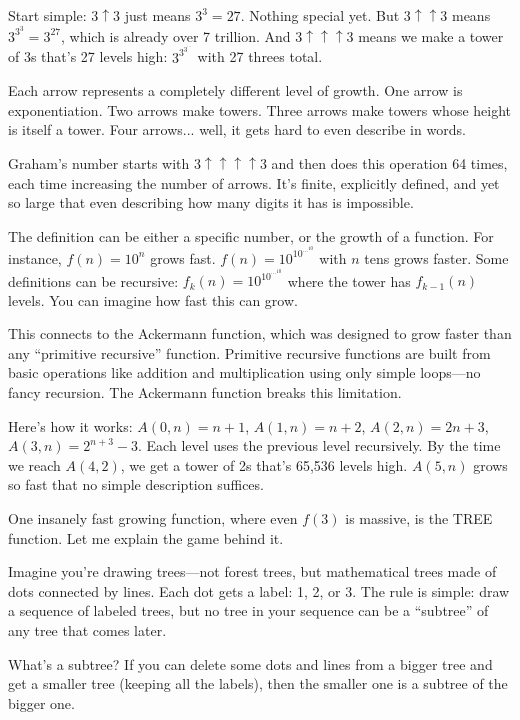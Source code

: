 Start simple: $3 \uparrow 3$ just means $3^3 = 27$. Nothing special yet. But $3 \uparrow\uparrow 3$ means $3^{3^3} = 3^{27}$, which is already over 7 trillion. And $3 \uparrow\uparrow\uparrow 3$ means we make a tower of 3s that's 27 levels high: $3^{3^{3^{\cdots}}}$ with 27 threes total.

Each arrow represents a completely different level of growth. One arrow is exponentiation. Two arrows make towers. Three arrows make towers whose height is itself a tower. Four arrows... well, it gets hard to even describe in words.

Graham's number starts with $3 \uparrow\uparrow\uparrow\uparrow 3$ and then does this operation 64 times, each time increasing the number of arrows. It's finite, explicitly defined, and yet so large that even describing how many digits it has is impossible.

The definition can be either a specific number, or the growth of a function. For instance, $f(n) = 10^n$ grows fast. $f(n) = 10^{10^{\cdots^{10}}}$ with $n$ tens grows faster. Some definitions can be recursive: $f_k(n) = 10^{10^{\cdots^{10}}}$ where the tower has $f_{k-1}(n)$ levels. You can imagine how fast this can grow.

This connects to the Ackermann function, which was designed to grow faster than any ``primitive recursive'' function. Primitive recursive functions are built from basic operations like addition and multiplication using only simple loops—no fancy recursion. The Ackermann function breaks this limitation.

Here's how it works: $A(0,n) = n+1$, $A(1,n) = n+2$, $A(2,n) = 2n+3$, $A(3,n) = 2^{n+3} - 3$. Each level uses the previous level recursively. By the time we reach $A(4,2)$, we get a tower of 2s that's 65,536 levels high. $A(5,n)$ grows so fast that no simple description suffices.

One insanely fast growing function, where even $f(3)$ is massive, is the TREE function. Let me explain the game behind it.

Imagine you're drawing trees—not forest trees, but mathematical trees made of dots connected by lines. Each dot gets a label: 1, 2, or 3. The rule is simple: draw a sequence of labeled trees, but no tree in your sequence can be a ``subtree'' of any tree that comes later.

What's a subtree? If you can delete some dots and lines from a bigger tree and get a smaller tree (keeping all the labels), then the smaller one is a subtree of the bigger one.

